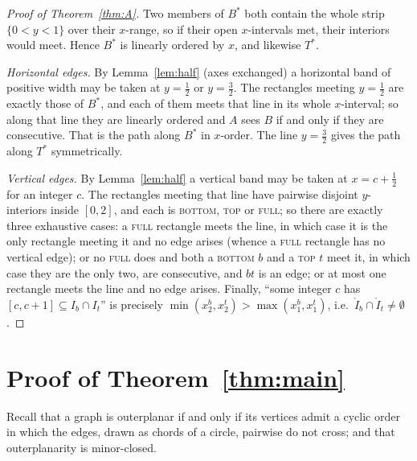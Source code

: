 \documentclass[11pt]{amsart}
\theoremstyle{remark}
\newcommand{\Bs}{B^{*}}
\newcommand{\Ts}{T^{*}}
\begin{document}
\begin{proof}[Proof of Theorem~\ref{thm:A}]
Two members of $\Bs$ both contain the whole strip $\{0<y<1\}$ over their $x$-range, so if
their open $x$-intervals met, their interiors would meet. Hence $\Bs$ is linearly
ordered by $x$, and likewise $\Ts$.

\emph{Horizontal edges.} By Lemma~\ref{lem:half} (axes exchanged) a horizontal band of
positive width may be taken at $y=\tfrac12$ or $y=\tfrac32$. The rectangles meeting
$y=\tfrac12$ are exactly those of $\Bs$, and each of them meets that line in its whole
$x$-interval; so along that line they are linearly ordered and $A$ sees $B$ if and only
if they are consecutive. That is the path along $\Bs$ in $x$-order. The line
$y=\tfrac32$ gives the path along $\Ts$ symmetrically.

\emph{Vertical edges.} By Lemma~\ref{lem:half} a vertical band may be taken at
$x=c+\tfrac12$ for an integer $c$. The rectangles meeting that line have pairwise
disjoint $y$-interiors inside $[0,2]$, and each is \textsc{bottom}, \textsc{top} or
\textsc{full}; so there are exactly three exhaustive cases: a \textsc{full} rectangle
meets the line, in which case it is the only rectangle meeting it and no edge arises
(whence a \textsc{full} rectangle has no vertical edge); or no \textsc{full} does and
both a \textsc{bottom} $b$ and a \textsc{top} $t$ meet it, in which case they are the
only two, are consecutive, and $bt$ is an edge; or at most one rectangle meets the line
and no edge arises. Finally, ``some integer $c$ has $[c,c+1]\subseteq I_b\cap I_t$'' is
precisely $\min(x_2^b,x_2^t)>\max(x_1^b,x_1^t)$, i.e.\ $\mathring I_b\cap\mathring
I_t\neq\emptyset$.
\end{proof}

\section{Proof of Theorem~\ref{thm:main}}

Recall that a graph is outerplanar if and only if its vertices admit a cyclic order in
which the edges, drawn as chords of a circle, pairwise do not cross; and that
outerplanarity is minor-closed.
\end{document}
